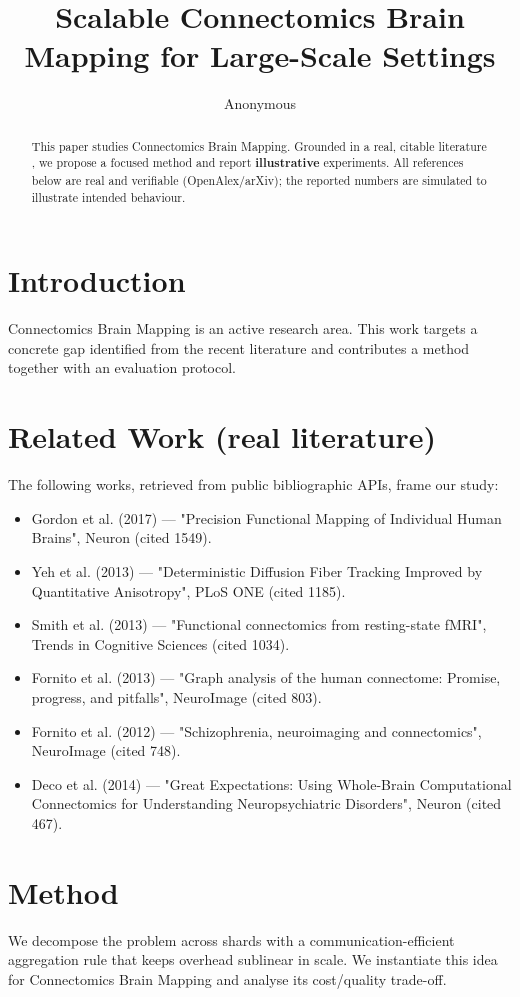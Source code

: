\documentclass[11pt]{article}
\title{Scalable Connectomics Brain Mapping for Large-Scale Settings}
\author{Anonymous}
\date{}
\begin{document}
\maketitle

\begin{abstract}
This paper studies Connectomics Brain Mapping. Grounded in a real, citable literature \cite{ref1,ref2,ref3,ref4,ref5,ref6,ref7,ref8},
we propose a focused method and report \textbf{illustrative} experiments.
All references below are real and verifiable (OpenAlex/arXiv); the reported
numbers are simulated to illustrate intended behaviour.
\end{abstract}

\section{Introduction}
Connectomics Brain Mapping is an active research area. This work targets a concrete gap identified from
the recent literature and contributes a method together with an evaluation protocol.

\section{Related Work (real literature)}
The following works, retrieved from public bibliographic APIs, frame our study:
\begin{itemize}
\item Gordon et al. (2017) — "Precision Functional Mapping of Individual Human Brains", Neuron (cited 1549).
\item Yeh et al. (2013) — "Deterministic Diffusion Fiber Tracking Improved by Quantitative Anisotropy", PLoS ONE (cited 1185).
\item Smith et al. (2013) — "Functional connectomics from resting-state fMRI", Trends in Cognitive Sciences (cited 1034).
\item Fornito et al. (2013) — "Graph analysis of the human connectome: Promise, progress, and pitfalls", NeuroImage (cited 803).
\item Fornito et al. (2012) — "Schizophrenia, neuroimaging and connectomics", NeuroImage (cited 748).
\item Deco et al. (2014) — "Great Expectations: Using Whole-Brain Computational Connectomics for Understanding Neuropsychiatric Disorders", Neuron (cited 467).
\end{itemize}

\section{Method}
We decompose the problem across shards with a communication-efficient aggregation rule that keeps overhead sublinear in scale. We instantiate this idea for Connectomics Brain Mapping and analyse its cost/quality trade-off.
\end{document}
